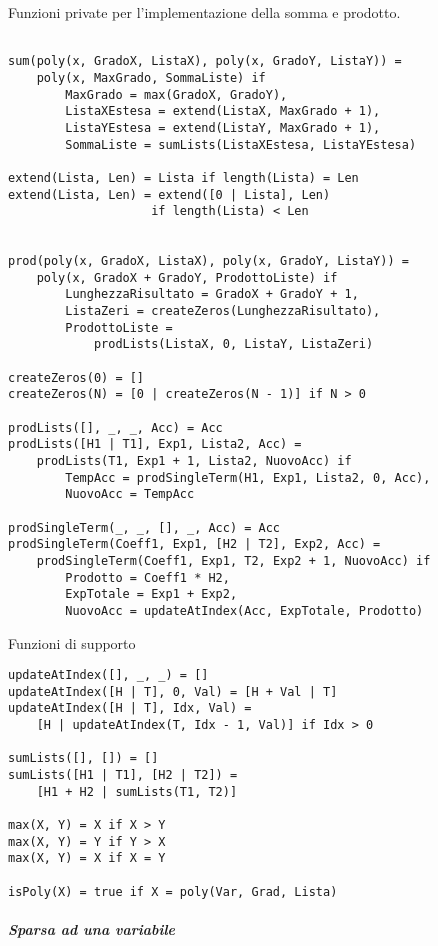 \documentclass[12pt,twoside]{report}
\begin{document}
Funzioni private per l'implementazione della somma e prodotto.

\begin{lstlisting}

sum(poly(x, GradoX, ListaX), poly(x, GradoY, ListaY)) = 
    poly(x, MaxGrado, SommaListe) if
        MaxGrado = max(GradoX, GradoY),
        ListaXEstesa = extend(ListaX, MaxGrado + 1),
        ListaYEstesa = extend(ListaY, MaxGrado + 1),
        SommaListe = sumLists(ListaXEstesa, ListaYEstesa)

extend(Lista, Len) = Lista if length(Lista) = Len
extend(Lista, Len) = extend([0 | Lista], Len) 
                    if length(Lista) < Len


prod(poly(x, GradoX, ListaX), poly(x, GradoY, ListaY)) = 
    poly(x, GradoX + GradoY, ProdottoListe) if
        LunghezzaRisultato = GradoX + GradoY + 1,
        ListaZeri = createZeros(LunghezzaRisultato),
        ProdottoListe = 
            prodLists(ListaX, 0, ListaY, ListaZeri)

createZeros(0) = []
createZeros(N) = [0 | createZeros(N - 1)] if N > 0

prodLists([], _, _, Acc) = Acc
prodLists([H1 | T1], Exp1, Lista2, Acc) = 
    prodLists(T1, Exp1 + 1, Lista2, NuovoAcc) if
        TempAcc = prodSingleTerm(H1, Exp1, Lista2, 0, Acc),
        NuovoAcc = TempAcc

prodSingleTerm(_, _, [], _, Acc) = Acc
prodSingleTerm(Coeff1, Exp1, [H2 | T2], Exp2, Acc) = 
    prodSingleTerm(Coeff1, Exp1, T2, Exp2 + 1, NuovoAcc) if
        Prodotto = Coeff1 * H2,
        ExpTotale = Exp1 + Exp2,
        NuovoAcc = updateAtIndex(Acc, ExpTotale, Prodotto)
\end{lstlisting}

Funzioni di supporto

\begin{lstlisting}
updateAtIndex([], _, _) = []
updateAtIndex([H | T], 0, Val) = [H + Val | T]
updateAtIndex([H | T], Idx, Val) = 
    [H | updateAtIndex(T, Idx - 1, Val)] if Idx > 0

sumLists([], []) = []
sumLists([H1 | T1], [H2 | T2]) = 
    [H1 + H2 | sumLists(T1, T2)]

max(X, Y) = X if X > Y
max(X, Y) = Y if Y > X
max(X, Y) = X if X = Y

isPoly(X) = true if X = poly(Var, Grad, Lista)
\end{lstlisting}

\subparagraph{Sparsa ad una variabile}
\end{document}
